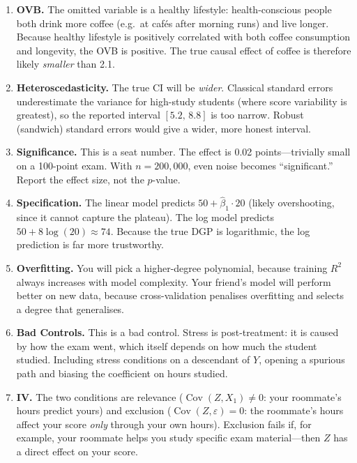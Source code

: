 \documentclass[11pt,a4paper]{article}
\theoremstyle{definition}
\theoremstyle{plain}
\theoremstyle{remark}
\newcommand{\Cov}{\operatorname{Cov}}
\begin{document}
\begin{enumerate}

\item \textbf{OVB.}
The omitted variable is a healthy lifestyle: health-conscious people both drink more coffee (e.g.\ at cafés after morning runs) and live longer. Because healthy lifestyle is positively correlated with both coffee consumption and longevity, the OVB is positive. The true causal effect of coffee is therefore likely \emph{smaller} than 2.1.

\item \textbf{Heteroscedasticity.}
The true CI will be \emph{wider}. Classical standard errors underestimate the variance for high-study students (where score variability is greatest), so the reported interval $[5.2,\,8.8]$ is too narrow. Robust (sandwich) standard errors would give a wider, more honest interval.

\item \textbf{Significance.}
This is a seat number. The effect is 0.02 points---trivially small on a 100-point exam. With $n=200{,}000$, even noise becomes ``significant.'' Report the effect size, not the $p$-value.

\item \textbf{Specification.}
The linear model predicts $50 + \hat\beta_1 \cdot 20$ (likely overshooting, since it cannot capture the plateau). The log model predicts $50 + 8\log(20) \approx 74$. Because the true DGP is logarithmic, the log prediction is far more trustworthy.

\item \textbf{Overfitting.}
You will pick a higher-degree polynomial, because training $R^2$ always increases with model complexity. Your friend's model will perform better on new data, because cross-validation penalises overfitting and selects a degree that generalises.

\item \textbf{Bad Controls.}
This is a bad control. Stress is post-treatment: it is caused by how the exam went, which itself depends on how much the student studied. Including stress conditions on a descendant of $Y$, opening a spurious path and biasing the coefficient on hours studied.

\item \textbf{IV.}
The two conditions are relevance ($\Cov(Z, X_1) \neq 0$: your roommate's hours predict yours) and exclusion ($\Cov(Z, \varepsilon) = 0$: the roommate's hours affect your score \emph{only} through your own hours). Exclusion fails if, for example, your roommate helps you study specific exam material---then $Z$ has a direct effect on your score.


\end{enumerate}
\end{document}
